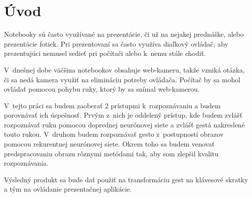 {}
{}
\chapter*{Úvod}\label{chap:intro}
{\color{red}
Notebooky sú často využívané na prezentácie, či už na nejakej prednáške, alebo prezentácie fotiek. Pri prezentovaní sa často využíva diaľkový ovládač, aby prezentujúci nemusel sedieť pri počítači alebo k~nemu stále chodiť.

V~dnešnej dobe väčšina notebookov obsahuje web-kameru, takže vzniká otázka, či sa nedá kamera využiť na elimináciu potreby ovládača. Počítač by sa mohol ovládať pomocou pohybu ruky, ktorý by sa snímal web-kamerou.

V~tejto práci sa budem zaoberať 2 prístupmi k~rozpoznávaniu a budem porovnávať ich úspešnosť. Prvým z~nich je oddelený prístup, kde budem zvlášť rozpoznávať ruku pomocou doprednej neurónovej siete a zvlášť gestá nakreslené touto rukou.
V~druhom budem rozpoznávať gesto z~postupnosti obrazov pomocou rekurentnej neurónovej siete. Okrem toho sa budem venovať predspracovaniu obrazu rôznymi metódami tak, aby som zlepšil kvalitu rozpoznávania.

Výsledný produkt sa bude dať použiť na transformáciu gest na klávesové skratky a tým na ovládanie prezentačnej aplikácie.
}

% 
% 
% 
% 
